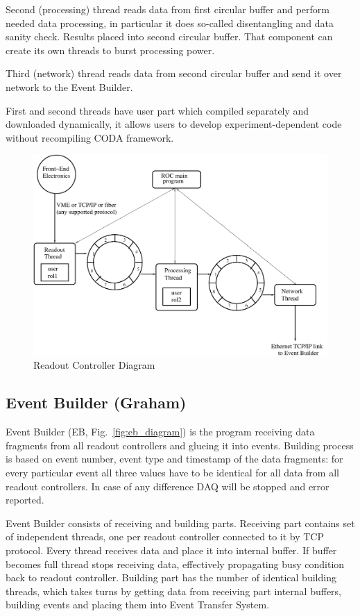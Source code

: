 Second (processing) thread reads data from first circular buffer and perform needed data processing, in particular it does so-called disentangling and data sanity check. Results placed into second circular buffer. That component can create its own threads to burst processing power.

Third (network) thread reads data from second circular buffer and send it over network to the Event Builder.

First and second threads have user part which compiled separately and downloaded dynamically, it allows users to develop experiment-dependent code without recompiling CODA framework.

\begin{figure}[hbt]
	\centering
	\includegraphics[width=1.0\columnwidth,keepaspectratio]{img/roc_diagram.pdf}
	\caption{Readout Controller Diagram}
	\label{fig:roc_diagram}
\end{figure}


\subsection{Event Builder (Graham)}

Event Builder (EB, Fig.~\ref{fig:eb_diagram}) is the program receiving data fragments from all readout controllers and glueing it into events. Building process is based on event number, event type and timestamp of the data fragments: for every particular event all three values have to be identical for all data from all readout controllers. In case of any difference DAQ will be stopped and error reported.

Event Builder consists of receiving and building parts. Receiving part contains set of independent threads, one per readout controller connected to it by TCP protocol. Every thread receives data and place it into internal buffer. If buffer becomes full thread stops receiving data, effectively propagating busy condition back to readout controller.
Building part has the number of identical building threads, which takes turns by getting data from receiving part internal buffers, building events and placing them into Event Transfer System.

